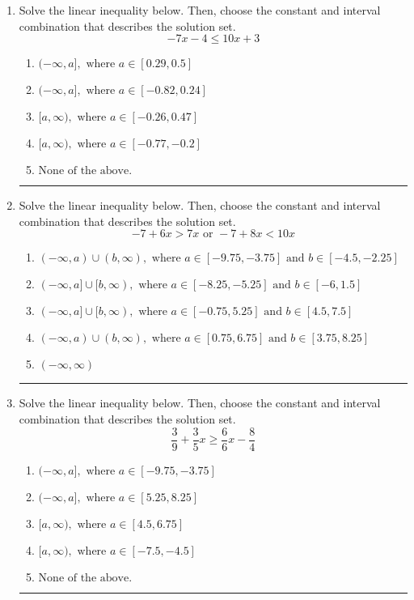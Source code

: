 \documentclass[14pt]{extbook}
\newcommand{\litem}[1]{\item#1\hspace*{-1cm}\rule{\textwidth}{0.4pt}}
\begin{document}
\begin{enumerate}
{\begin{enumerate}[label=\Alph*.]
\end{enumerate} }
\litem{
Solve the linear inequality below. Then, choose the constant and interval combination that describes the solution set.\[ -7x -4 \leq 10x + 3 \]\begin{enumerate}[label=\Alph*.]
\item \( (-\infty, a], \text{ where } a \in [0.29, 0.5] \)
\item \( (-\infty, a], \text{ where } a \in [-0.82, 0.24] \)
\item \( [a, \infty), \text{ where } a \in [-0.26, 0.47] \)
\item \( [a, \infty), \text{ where } a \in [-0.77, -0.2] \)
\item \( \text{None of the above}. \)

\end{enumerate} }
\litem{
Solve the linear inequality below. Then, choose the constant and interval combination that describes the solution set.\[ -7 + 6 x > 7 x \text{ or } -7 + 8 x < 10 x \]\begin{enumerate}[label=\Alph*.]
\item \( (-\infty, a) \cup (b, \infty), \text{ where } a \in [-9.75, -3.75] \text{ and } b \in [-4.5, -2.25] \)
\item \( (-\infty, a] \cup [b, \infty), \text{ where } a \in [-8.25, -5.25] \text{ and } b \in [-6, 1.5] \)
\item \( (-\infty, a] \cup [b, \infty), \text{ where } a \in [-0.75, 5.25] \text{ and } b \in [4.5, 7.5] \)
\item \( (-\infty, a) \cup (b, \infty), \text{ where } a \in [0.75, 6.75] \text{ and } b \in [3.75, 8.25] \)
\item \( (-\infty, \infty) \)

\end{enumerate} }
\litem{
Solve the linear inequality below. Then, choose the constant and interval combination that describes the solution set.\[ \frac{3}{9} + \frac{3}{5} x \geq \frac{6}{6} x - \frac{8}{4} \]\begin{enumerate}[label=\Alph*.]
\item \( (-\infty, a], \text{ where } a \in [-9.75, -3.75] \)
\item \( (-\infty, a], \text{ where } a \in [5.25, 8.25] \)
\item \( [a, \infty), \text{ where } a \in [4.5, 6.75] \)
\item \( [a, \infty), \text{ where } a \in [-7.5, -4.5] \)
\item \( \text{None of the above}. \)


\end{enumerate}}
\end{enumerate}
\end{document}
